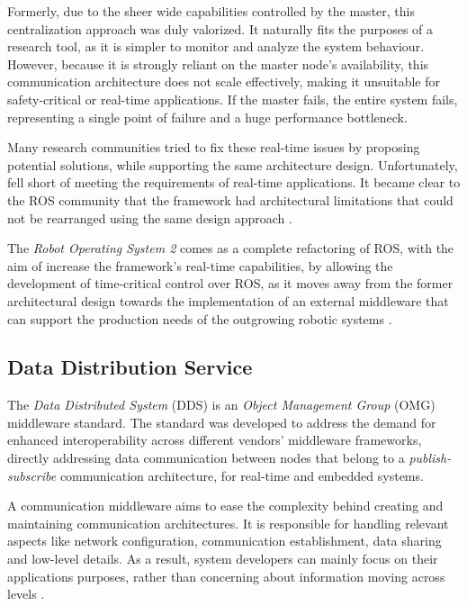 Formerly, due to the sheer wide capabilities controlled by the master, this centralization approach was duly valorized. It naturally fits the purposes of a research tool, as it is simpler to monitor and analyze the system behaviour. However, because it is strongly reliant on the master node's availability, this communication architecture does not scale effectively, making it unsuitable for safety-critical or real-time applications. If the master fails, the entire system fails, representing a single point of failure and a huge performance bottleneck.

Many research communities tried to fix these real-time issues by proposing potential solutions, while supporting the same architecture design. Unfortunately, fell short of meeting the requirements of real-time applications. It became clear to the ROS community that the framework had architectural limitations that could not be rearranged using the same design approach \cite{maruyama2016exploring, dieber2020penetration}.

The \textit{Robot Operating System 2} comes as a complete refactoring of ROS, with the aim of increase the framework's real-time capabilities, by allowing the development of time-critical control over ROS, as it moves away from the former architectural design towards the implementation of an external middleware that can support the production needs of the outgrowing robotic systems \cite{kim2018security, casini2019response}.

\subsection{Data Distribution Service}

The \textit{Data Distributed System} (DDS) \cite{3} is an \textit{Object Management Group} (OMG) middleware standard. The standard was developed to address the demand for enhanced interoperability across different vendors' middleware frameworks, directly addressing data communication between nodes that belong to a \textit{publish-subscribe} communication architecture, for real-time and embedded systems. 

A communication middleware aims to ease the complexity behind creating and maintaining communication architectures. It is responsible for handling relevant aspects like network configuration, communication establishment, data sharing and low-level details. As a result, system developers can mainly focus on their applications purposes, rather than concerning about information moving across levels \cite{dds-what-is}. 

